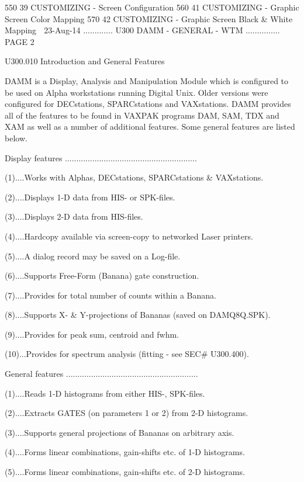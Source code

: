    550  39  CUSTOMIZING  - Screen Configuration
   560  41  CUSTOMIZING  - Graphic Screen Color Mapping
   570  42  CUSTOMIZING  - Graphic Screen Black & White Mapping
    
   23-Aug-14 ............. U300  DAMM - GENERAL - WTM ............... PAGE   2
 
   U300.010  Introduction and General Features
 
   DAMM  is a Display, Analysis and Manipulation Module which is configured to
   be used on Alpha workstations running Digital  Unix.  Older  versions  were
   configured  for  DECstations,  SPARCstations and VAXstations. DAMM provides
   all of the features to be found in VAXPAK programs DAM, SAM,  TDX  and  XAM
   as  well  as  a  number  of  additional features. Some general features are
   listed below.
 
   Display features ..........................................................
 
   (1)....Works with Alphas, DECstations, SPARCstations & VAXstations.
 
   (2)....Displays 1-D data from HIS- or SPK-files.
 
   (3)....Displays 2-D data from HIS-files.
 
   (4)....Hardcopy available via screen-copy to networked Laser printers.
 
   (5)....A dialog record may be saved on a Log-file.
 
   (6)....Supports Free-Form (Banana) gate construction.
 
   (7)....Provides for total number of counts within a Banana.
 
   (8)....Supports X- & Y-projections of Bananas (saved on DAMQ8Q.SPK).
 
   (9)....Provides for peak sum, centroid and fwhm.
 
   (10)...Provides for spectrum analysis (fitting - see SEC# U300.400).
 
 
   General features ..........................................................
 
   (1)....Reads 1-D histograms from either HIS-, SPK-files.
 
   (2)....Extracts GATES (on parameters 1 or 2) from 2-D histograms.
 
   (3)....Supports general projections of Bananas on arbitrary axis.
 
   (4)....Forms linear combinations, gain-shifts etc. of 1-D histograms.
 
   (5)....Forms linear combinations, gain-shifts etc. of 2-D histograms.
 
